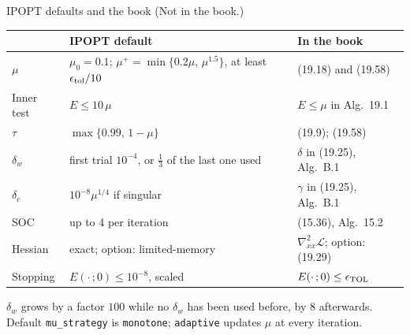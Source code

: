 \documentclass[aspectratio=169,12pt]{beamer}
\newcommand{\cL}{\mathcal{L}}
\newcommand{\hessL}{\nabla_{xx}^{2}\cL}
\begin{document}
\begin{frame}{IPOPT defaults and the book {\normalfont\small(Not in the book.)}}
  \begin{center}\small\setlength\tabcolsep{5pt}
  \renewcommand{\arraystretch}{1.1}
  \begin{tabular}{lll}
    \toprule
     & IPOPT default & In the book \\
    \midrule
    $\mu$ & $\mu_{0}=0.1$; $\mu^{+}=\min\{0.2\mu,\,\mu^{1.5}\}$, at least $\epsilon_{\rm tol}/10$ & (19.18) and (19.58) \\
    Inner test & $E\le 10\,\mu$ & $E\le\mu$ in Alg.\ 19.1 \\
    $\tau$ & $\max\{0.99,\,1-\mu\}$ & (19.9); (19.58) \\
    $\delta_{w}$ & first trial $10^{-4}$, or $\tfrac13$ of the last one used & $\delta$ in (19.25), Alg.\ B.1 \\
    $\delta_{c}$ & $10^{-8}\mu^{1/4}$ if singular & $\gamma$ in (19.25), Alg.\ B.1 \\
    SOC & up to 4 per iteration & (15.36), Alg.\ 15.2 \\
    Hessian & exact; option: limited-memory & $\hessL$; option: (19.29) \\
    Stopping & $E(\cdot\,;0)\le 10^{-8}$, scaled & $E(\cdot\,;0)\le\epsilon_{\rm TOL}$ \\
    \bottomrule
  \end{tabular}
  \end{center}
  $\delta_{w}$ grows by a factor $100$ while no $\delta_{w}$ has been used before, by $8$ afterwards.\\
  Default \texttt{mu\_strategy} is \texttt{monotone}; \texttt{adaptive} updates $\mu$ at every iteration.
\end{frame}
\end{document}
